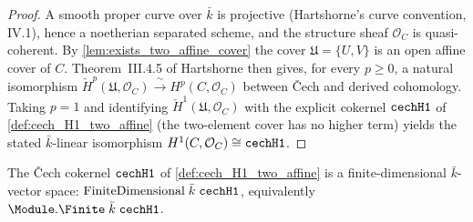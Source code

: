 \begin{proof}
  A smooth proper curve over \(\bar k\) is projective (Hartshorne's
  curve convention, IV.1), hence a noetherian separated scheme, and the
  structure sheaf \(\mathcal O_C\) is quasi-coherent. By
  \cref{lem:exists_two_affine_cover} the cover \(\mathfrak U = \{U, V\}\)
  is an open affine cover of \(C\). Theorem~III.4.5 of Hartshorne then
  gives, for every \(p \ge 0\), a natural isomorphism
  \(\check H^p(\mathfrak U, \mathcal O_C) \xrightarrow{\;\sim\;}
  H^p(C, \mathcal O_C)\) between Čech and derived cohomology. Taking
  \(p = 1\) and identifying \(\check H^1(\mathfrak U, \mathcal O_C)\)
  with the explicit cokernel \(\mathtt{cechH1}\) of
  \cref{def:cech_H1_two_affine} (the two-element cover has no higher
  term) yields the stated \(\bar k\)-linear isomorphism
  \(H^1(C, \mathcal O_C) \cong \mathtt{cechH1}\).

\end{proof}

\begin{lemma}
  \label{lem:cech_H1_two_affine_finiteDimensional}
  The Čech cokernel \(\mathtt{cechH1}\) of \cref{def:cech_H1_two_affine} is a
  finite-dimensional \(\bar k\)-vector space:
  \(\mathrm{FiniteDimensional}\;\bar k\;\mathtt{cechH1}\), equivalently
  \(\Module.\Finite\;\bar k\;\cechHI\).
\end{lemma}

